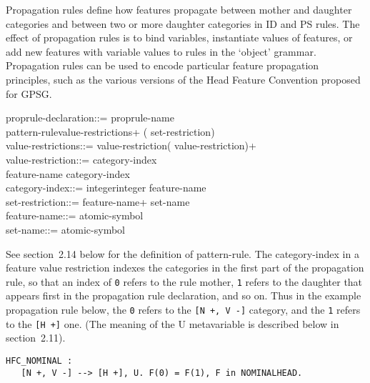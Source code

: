 Propagation rules define how features propagate between mother
and daughter categories and between two or more daughter categories in
ID and PS rules.  The effect of propagation rules is to bind variables,
instantiate values of features, or add new features with variable values
to rules in the `object' grammar. Propagation rules can be used to
encode particular feature propagation principles, such as the various
versions of the Head Feature Convention proposed for GPSG.
\begin{display}
\la proprule-declaration\ra ::= \la proprule-name\ra \lit{:}\\
\cont \la pattern-rule\ra \la value-restrictions\ran+ (\lit{,}   \la set-restriction\ran) \\
\la value-restrictions\ra ::= \la value-restriction\ra (\lit{=} \la value-restriction\ran)+\\
\la value-restriction\ra ::=  \lit{(} \la category-index\ra \lit{)} \alt\\
\cont \la feature-name\ra \lit{(} \la category-index\ra \lit{)}\\
\la category-index\ra ::= \la integer\ra \alt \la integer\ra \lit{[} \la feature-name\ra \lit{]}\\
\la set-restriction\ra ::= \lit{\{} \la feature-name\ran+ \lit{\}} \alt \la set-name\ra\\
\la feature-name\ra ::= \la atomic-symbol\ra\\
\la set-name\ra ::= \la atomic-symbol\ra
\end{display}
See section~2.14 below for the definition of \la pattern-rule\ran. The
category-index in a feature value restriction indexes the categories in the
first part of the propagation rule, so that an index of {\tt 0} refers
to the rule mother, {\tt 1} refers to the daughter that appears first in
the propagation rule declaration, and so on. 
Thus in the example propagation rule below, the {\tt 0} refers to the
{\tt [N +, V -]} category, and the {\tt 1} refers to the {\tt [H +]} one.
(The meaning of the U metavariable is described below in section~2.11).
\begin{ex}
\begin{verbatim}
HFC_NOMINAL : 
   [N +, V -] --> [H +], U. F(0) = F(1), F in NOMINALHEAD.
\end{verbatim}
\end{ex}

